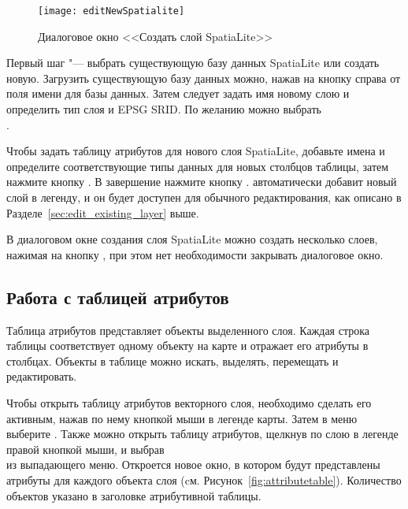 \begin{figure}[ht]
   \centering
   \texttt{[image: editNewSpatialite]}
   \caption{Диалоговое окно <<Создать слой SpatiaLite>> \wincaption}\label{fig:newspatialitelayer}
\end{figure}

Первый шаг "--- выбрать существующую базу данных SpatiaLite или создать
новую. Загрузить существующую базу данных можно, нажав на кнопку 
справа от поля имени для базы данных. Затем следует задать имя новому слою и
определить тип слоя и EPSG SRID. По желанию можно выбрать \\
.

Чтобы задать таблицу атрибутов для нового слоя SpatiaLite, добавьте имена
и определите соответствующие типы данных для новых столбцов таблицы, затем
нажмите кнопку . В завершение нажмите кнопку .
\qg автоматически добавит новый слой в легенду, и он будет доступен для
обычного редактирования, как описано в Разделе~\ref{sec:edit_existing_layer} выше.

В диалоговом окне создания слоя SpatiaLite можно создать несколько слоев,
нажимая на кнопку , при этом нет необходимости закрывать
диалоговое окно.

\subsection{Работа с таблицей атрибутов}
\label{sec:attribute table}

Таблица атрибутов представляет объекты выделенного слоя. Каждая строка таблицы
соответствует одному объекту на карте и отражает его атрибуты в столбцах.
Объекты в таблице можно искать, выделять, перемещать и редактировать.

Чтобы открыть таблицу атрибутов векторного слоя, необходимо сделать его активным,
нажав по нему кнопкой мыши в легенде карты. Затем в меню 
выберите .
Также можно открыть таблицу атрибутов, щелкнув по слою в легенде правой
кнопкой мыши, и выбрав \\
из выпадающего меню. Откроется новое окно, в котором будут представлены атрибуты
для каждого объекта слоя (cм. Рисунок~\ref{fig:attributetable}). Количество
объектов указано в заголовке атрибутивной таблицы.

